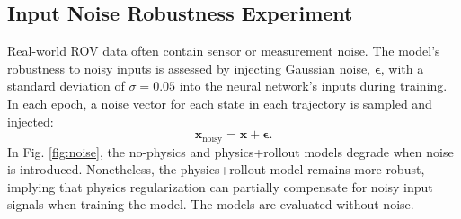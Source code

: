 \documentclass[conference]{IEEEtran}
\begin{document}
{%
% 

\subsection{Input Noise Robustness Experiment}
\label{subsec:input_noise}
Real-world ROV data often contain sensor or measurement noise. The model’s robustness to noisy inputs is assessed by injecting Gaussian noise, $\bm{\epsilon}$, with a standard deviation of $\sigma = 0.05$ into the neural network's inputs during training.
In each epoch, a noise vector for each state in each trajectory is sampled and injected:
\begin{equation}
    \mathbf{x}_{\text{noisy}} = \mathbf{x} + \bm{\epsilon}.
\end{equation}
In Fig. \ref{fig:noise}, the no-physics and physics+rollout models degrade when noise is introduced. Nonetheless, the physics+rollout model remains more robust, implying that physics regularization can partially compensate for noisy input signals when training the model. The models are evaluated without noise.


}
\end{document}
